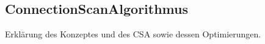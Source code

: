 \subsection{ConnectionScanAlgorithmus}
Erklärung des Konzeptes und des CSA sowie dessen Optimierungen. 